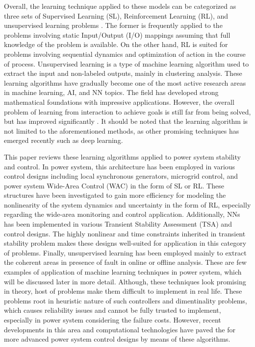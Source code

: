 \documentclass[journal]{IEEEtran}
\begin{document}
Overall, the learning technique applied to these models can be categorized as three sets of Supervised Learning (SL), Reinforcement Learning (RL), and unsupervised learning problems \cite{Sutton1998a}. The former is frequently applied to the problems involving static Input/Output (I/O) mappings assuming that full knowledge of the problem is available. On the other hand, RL is suited for problems involving sequential dynamics and optimization of action in the course of process. Unsupervised learning is a type of machine learning algorithm used to extract the input and non-labeled outputs, mainly in clustering analysis. These learning algorithms have gradually become one of the most active research areas in machine learning, AI, and NN topics.  The field has developed strong mathematical foundations with impressive applications. However, the overall problem of learning from interaction to achieve goals is still far from being solved, but has improved significantly \cite{meireles2003comprehensive}. It should be noted that the learning algorithm is not limited to the aforementioned methods, as other promising techniques has emerged recently such as deep learning.

This paper reviews these learning algorithms applied to power system stability and control. In power system, this architecture has been employed in various control designs including local synchronous generators, microgrid control, and power system Wide-Area Control (WAC) in the form of SL or RL. These structures have been investigated to gain more efficiency for modeling the nonlinearity of the system dynamics and uncertainty in the form of RL, especially regarding the wide-area monitoring and control application. Additionally, NNs has been implemented in various Transient Stability Assessment (TSA) and control designs. The highly nonlinear and time constraints inherited in transient stability problem makes these designs well-suited for application in this category of problems. Finally, unsupervised learning has been employed mainly to extract the coherent areas in presence of fault in online or offline analysis. These are few examples of application of machine learning techniques in power system, which will be discussed later in more detail. Although, these techniques look promising in theory, host of problems make them difficult to implement in real life. These problems root in heuristic nature of such controllers and dimentinality problems, which causes reliability issues and cannot be fully trusted to implement, especially in power system considering the failure costs. However, recent developments in this area and computational technologies have paved the for more advanced power system control designs by means of these algorithms. 
\end{document}
